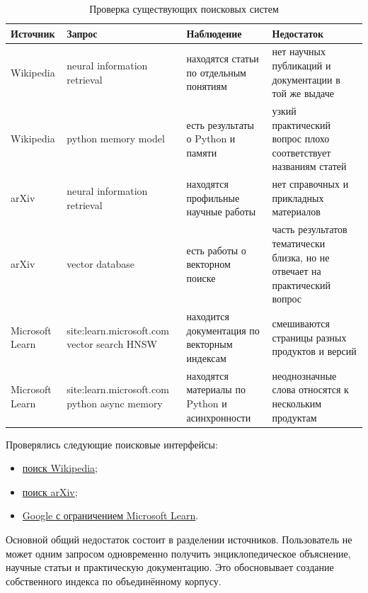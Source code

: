 \documentclass[pdf,unicode,12pt,a4paper,oneside,fleqn]{article}
\begin{document}
\begin{table}[htbp]
\centering
\small
\caption{Проверка существующих поисковых систем}
\label{tab:search}
\begin{tabular}{|p{}|p{}|p{}|p{}|}
\hline
\textbf{Источник} & \textbf{Запрос} & \textbf{Наблюдение} &
\textbf{Недостаток} \\
\hline
Wikipedia & neural information retrieval & находятся статьи по отдельным понятиям &
нет научных публикаций и документации в той же выдаче \\
\hline
Wikipedia & python memory model & есть результаты о Python и памяти &
узкий практический вопрос плохо соответствует названиям статей \\
\hline
arXiv & neural information retrieval & находятся профильные научные работы &
нет справочных и прикладных материалов \\
\hline
arXiv & vector database & есть работы о векторном поиске & часть результатов
тематически близка, но не отвечает на практический вопрос \\
\hline
Microsoft Learn & site:learn.\newline microsoft.com vector search HNSW & находится
документация по векторным индексам & смешиваются страницы разных продуктов и
версий \\
\hline
Microsoft Learn & site:learn.\newline microsoft.com python async memory & находятся
материалы по Python и асинхронности & неоднозначные слова относятся к нескольким
продуктам \\
\hline
\end{tabular}
\end{table}

Проверялись следующие поисковые интерфейсы:

\begin{itemize}
    \item \href{https://en.wikipedia.org/w/index.php?search=neural+information+retrieval}{поиск Wikipedia};
    \item \href{https://arxiv.org/search/?query=\%22neural+information+retrieval\%22\&searchtype=all}{поиск arXiv};
    \item \href{https://www.google.com/search?q=site:learn.microsoft.com+vector+search+HNSW}{Google с ограничением Microsoft Learn}.
\end{itemize}

Основной общий недостаток состоит в разделении источников. Пользователь не может
одним запросом одновременно получить энциклопедическое объяснение, научные
статьи и практическую документацию. Это обосновывает создание собственного
индекса по объединённому корпусу.
\end{document}
